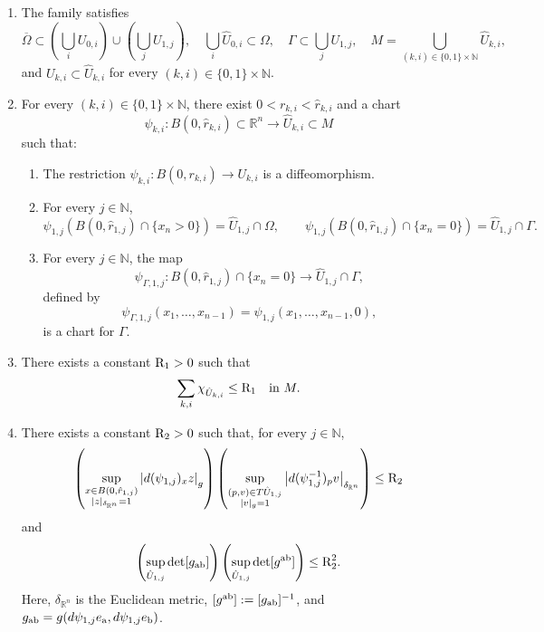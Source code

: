 \documentclass[reqno, 11pt, a4paper]{amsart}
\numberwithin{equation}{section}
\newcommand{\gij}{\textnormal{a}  \textnormal{b}}
\newcommand{\ck}{\textnormal K}
\newcommand{\rd}{\textnormal{R}}
\newcommand{\pvr}{p}
\begin{document}
\begin{enumerate}[label=($U_{\arabic*}$)]
\item \label{5} The family satisfies
\[
\overline{\Omega}
\subset
\left(\bigcup_i U_{0,i}\right)\cup\left(\bigcup_j U_{1,j}\right),
\quad
\bigcup_i\hat U_{0,i}\subset\Omega,
\quad
\Gamma\subset\bigcup_j U_{1,j}, \quad  M= \bigcup _{(k,i)\in \{0,1\} \times \mathbb{N}} \hat U _{k,i},
\]
and \(U_{k,i}\subset\hat U_{k,i}\) for every \((k,i)\in\{0,1\}\times\mathbb N\). %

\item \label{2} For every \((k,i)\in\{0,1\}\times\mathbb N\), there exist \(0<r_{k,i}<\hat r_{k,i}\) and a chart
\[
\psi_{k,i}:B(0,\hat r_{k,i})\subset\mathbb R^n\longrightarrow\hat U_{k,i}\subset M
\]
such that:
\begin{enumerate}[label=($\alph*$)]
   \item The restriction \(\psi_{k,i}:B(0,r_{k,i})\rightarrow U_{k,i}\) is a diffeomorphism.

   \item For every \(j\in\mathbb N\),
   \[
   { 
   \psi_{1,j}\left(B(0,\hat r_{1,j})\cap\{x_n>0\}\right)
   =\hat U_{1,j}\cap\Omega,
   \qquad
   \psi_{1,j}\left(B(0,\hat r_{1,j})\cap\{x_n=0\}\right)
   =\hat U_{1,j}\cap\Gamma.
   }
   \]

   \item For every \(j\in\mathbb N\), the map
   \[
   \psi_{\Gamma,1,j}:B(0,\hat r_{1,j})\cap\{x_n=0\}\longrightarrow\hat U_{1,j}\cap\Gamma,
   \]
   defined by
   \[
   \psi_{\Gamma,1,j}(x_1,\ldots,x_{n-1})
   =\psi_{1,j}(x_1,\ldots,x_{n-1},0),
   \]
   is a chart for \(\Gamma\).
\end{enumerate}

\item \label{1} There exists a constant \(\rd_1>0\) such that
\[
\sum_{k,i}\chi_{\hat U_{k,i}}\leq\rd_1
\quad\text{in }M.
\]

\item \label{3} There exists a constant \(\rd_2>0\) such that, for every \(j\in\mathbb N\),
\[
\left(
\sup_{\substack{x\in B(0,\hat r_{1,j})\\ |z|_{\delta_{\mathbb R^n}}=1}}
\left|d(\psi_{1,j})_x z\right|_g
\right)
\left(
\sup_{\substack{(\pvr,v)\in T\hat U_{1,j}\\ |v|_g=1}}
\left|d(\psi_{1,j}^{-1})_{\pvr}v\right|_{\delta_{\mathbb R^n}}
\right)
\leq\rd_2
\]
and
\[
\left(\sup_{\hat U_{1,j}}\det[g_{\gij}]\right)
\left(\sup_{\hat U_{1,j}}\det[g^{\gij}]\right)
\leq\rd_2^2.
\]
Here, \(\delta_{\mathbb R^n}\) is the Euclidean metric,
\([g^{\gij}]:=[g_{\gij}]^{-1}\), and
\(g_{\gij}=g(d\psi_{1,j}e_{\textnormal a},d\psi_{1,j}e_{\textnormal b})\).
\end{enumerate}
\end{document}
